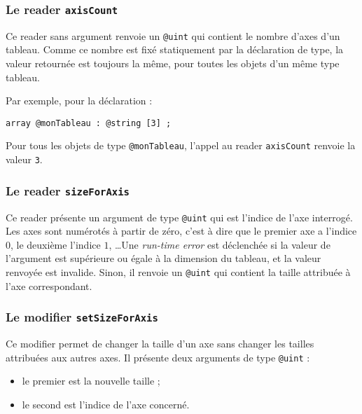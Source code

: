 \subsubsection{Le reader \lstinline[language=galgas]!axisCount!}

Ce reader sans argument renvoie un \lstinline[language=galgas]!@uint! qui contient le nombre d'axes d'un tableau. Comme ce nombre est fixé statiquement par la déclaration de type, la valeur retournée est toujours la même, pour toutes les objets d'un même type tableau.


Par exemple, pour la déclaration :
\begin{lstlisting}[language=galgas]
array @monTableau : @string [3] ;
\end{lstlisting}
Pour tous les objets de type \lstinline[language=galgas]!@monTableau!, l'appel au reader \lstinline[language=galgas]!axisCount! renvoie la valeur \lstinline[language=galgas]!3!.


\subsubsection{Le reader \lstinline[language=galgas]!sizeForAxis!}

Ce reader présente un argument de type \lstinline[language=galgas]!@uint! qui est l'indice de l'axe interrogé. Les axes sont numérotés à partir de zéro, c'est à dire que le premier axe a l'indice $0$, le deuxième l'indice $1$, \dots Une \emph{run-time error} est déclenchée si la valeur de l'argument est supérieure ou égale à la dimension du tableau, et la valeur renvoyée est invalide. Sinon, il renvoie un \lstinline[language=galgas]!@uint! qui contient la taille attribuée à l'axe correspondant.




\subsubsection{Le modifier \lstinline[language=galgas]!setSizeForAxis!}

Ce modifier permet de changer la taille d'un axe sans changer les tailles attribuées aux autres axes. Il présente deux arguments de type \lstinline[language=galgas]!@uint! :
\begin{itemize}
  \item le premier est la nouvelle taille ;
  \item le second est l'indice de l'axe concerné.
\end{itemize}

